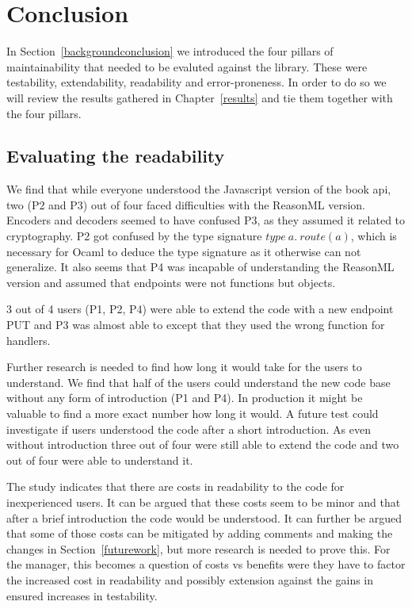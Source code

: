 \chapter{Conclusion}\label{conclusion}

In Section~\ref{backgroundconclusion} we introduced the four pillars of
maintainability that needed to be evaluted against the library. These were
testability, extendability, readability and error-proneness. In order to do so
we will review the results gathered in Chapter~\ref{results} and tie them
together with the four pillars.

\section{Evaluating the readability}

We find that while everyone understood the Javascript version of the book api,
two (P2 and P3) out of four faced difficulties with the ReasonML version.
Encoders and decoders seemed to have confused P3, as they assumed it related to
cryptography. P2 got confused by the type signature $type\ a.\ route(a)$, which
is necessary for Ocaml to deduce the type signature as it otherwise can not
generalize.  It also seems that P4 was incapable of understanding the ReasonML
version and assumed that endpoints were not functions but objects.

3 out of 4 users (P1, P2, P4) were able to extend the code with a new endpoint
PUT and P3 was almost able to except that they used the wrong function for
handlers.

Further research is needed to find how long it would take for the users to
understand.  We find that half of the users could understand the new code base
without any form of introduction (P1 and P4). In production it might be
valuable to find a more exact number how long it would. A future test could
investigate if users understood the code after a short introduction. As even
without introduction three out of four were still able to extend the code and
two out of four were able to understand it.

The study indicates that there are costs in readability to the code for
inexperienced users. It can be argued that these costs seem to be minor and that
after a brief introduction the code would be understood. It can further be
argued that some of those costs can be mitigated by adding comments and making
the changes in Section~\ref{futurework}, but more research is needed to prove
this. For the manager, this becomes a question of costs vs benefits were they
have to factor the increased cost in readability and possibly extension against
the gains in ensured increases in testability. 

